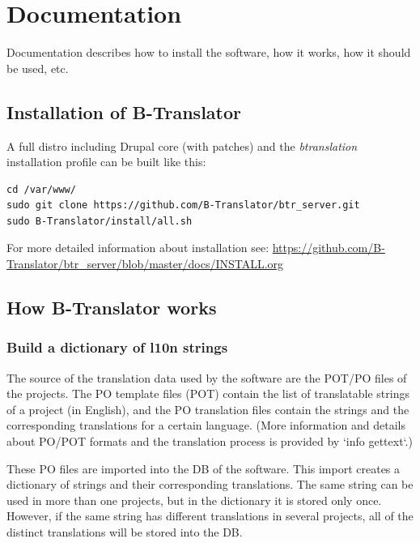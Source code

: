 \documentclass[11pt]{article}
\begin{document}
\section{Documentation}
\label{sec-8}


  Documentation describes how to install the software, how it works,
  how it should be used, etc.

\subsection{Installation of B-Translator}
\label{sec-8.1}


   A full distro including Drupal core (with patches) and the
   \emph{btranslation} installation profile can be built like this:

\begin{verbatim}
cd /var/www/
sudo git clone https://github.com/B-Translator/btr_server.git
sudo B-Translator/install/all.sh
\end{verbatim}



   For more detailed information about installation see:
   \href{https://github.com/B-Translator/btr\_server/blob/master/docs/INSTALL.org}{https://github.com/B-Translator/btr\_server/blob/master/docs/INSTALL.org}

\subsection{How B-Translator works}
\label{sec-8.2}


\subsubsection{Build a dictionary of l10n strings}
\label{sec-8.2.1}


    The source of the translation data used by the software are the
    POT/PO files of the projects.  The PO template files (POT) contain
    the list of translatable strings of a project (in English), and the
    PO translation files contain the strings and the corresponding
    translations for a certain language.  (More information and details
    about PO/POT formats and the translation process is provided by
    `info gettext`.)

    These PO files are imported into the DB of the software. This
    import creates a dictionary of strings and their corresponding
    translations. The same string can be used in more than one
    projects, but in the dictionary it is stored only once. However, if
    the same string has different translations in several projects, all
    of the distinct translations will be stored into the DB.
\end{document}
